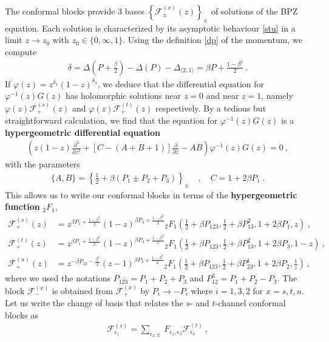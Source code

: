 \documentclass[12pt, a4paper]{article}
\theoremstyle{break}
\begin{document}
The conformal blocks provide 3 bases $\left\{\mathcal{F}^{(x)}_\pm(z)\right\}_\pm$ of solutions of the BPZ equation. Each solution is characterized by its asymptotic behaviour \eqref{stu} in a limit $z\to z_0$ with $z_0\in\{0,\infty,1\}$. Using the definition \eqref{dp} of the momentum, we compute 
\begin{align}
 \delta=\Delta\left(P+\tfrac{\beta}{2}\right) - \Delta(P) -\Delta_{\langle 2,1\rangle} = \beta P + \tfrac{1-\beta^2}{2}\ .
\end{align}
If $\varphi(z) = z^{\delta_1}(1-z)^{\delta_3}$, we deduce that the differential equation for $\varphi^{-1}(z) G(z)$ has holomorphic solutions near $z=0$ and near $z=1$, namely $\varphi(z)\mathcal{F}^{(s)}_+(z)$ and $\varphi(z)\mathcal{F}^{(t)}_+(z)$ respectively. By a tedious but straightforward calculation, we find that the equation for $\varphi^{-1}(z) G(z)$ is a \textbf{hypergeometric differential equation} 
\begin{align}
 \left(z(1-z)\frac{\partial^2}{\partial z^2} + \left[C-(A+B+1)\right]\frac{\partial}{\partial z} -AB\right) \varphi^{-1}(z) G(z) = 0 \ , 
\end{align}
with the parameters 
\begin{align}
 \{A,B\} = \left\{\tfrac12+\beta(P_1\pm P_2+P_3)\right\}_\pm \quad , \quad  C=1+2\beta P_1\ .
\end{align}
This allows us to write our conformal blocks in terms of the \textbf{hypergeometric function} ${}_2F_1$,
\begin{align}
 \mathcal{F}_+^{(s)}(z) &= z^{\beta P_1 +\frac{1-\beta^2}{2}}(1-z)^{\beta P_3 + \frac{1-\beta^2}{2}} {}_2F_1\left(\tfrac12+ \beta P_{123},\tfrac12+\beta P_{13}^2,1+2\beta P_1,z\right) \ , 
 \\
 \mathcal{F}_+^{(t)}(z) &= z^{\beta P_1 +\frac{1-\beta^2}{2}}(1-z)^{\beta P_3 + \frac{1-\beta^2}{2}} {}_2F_1\left(\tfrac12+ \beta P_{123},\tfrac12+\beta P_{13}^2,1+2\beta P_3,1-z\right) \ , 
 \\
 \mathcal{F}_+^{(u)}(z) &= z^{-\beta P_{23} -\frac{\beta^2}{2}}(z-1)^{\beta P_3 + \frac{1-\beta^2}{2}} {}_2F_1\left(\tfrac12+ \beta P_{123},\tfrac12+\beta P_{23}^1,1+2\beta P_2,\tfrac{1}{z}\right) \ , 
\end{align}
where we used the notations $P_{123}=P_1+P_2+P_3$ and $P_{12}^3 = P_1+P_2-P_3$. The block $\mathcal{F}^{(x)}_-$ is obtained from $\mathcal{F}^{(x)}_+$ by $P_i\to -P_i$ where $i=1,3,2$ for $x=s,t,u$. 
Let us write 
the change of basis that relates the $s$- and $t$-channel conformal blocks as 
\begin{align}
 \mathcal{F}^{(s)}_{\epsilon_1} = \sum_{\epsilon_3\pm} F_{\epsilon_1,\epsilon_3} \mathcal{F}^{(t)}_{\epsilon_3}\ , 
 \label{fsfft}
\end{align}
\end{document}
